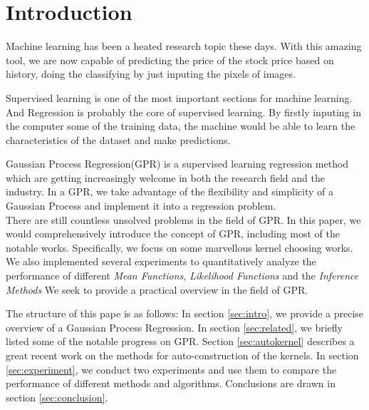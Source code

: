 \section{Introduction} \label{sec:introduction}

Machine learning has been a heated research topic these days. With this amazing tool, we are now capable of predicting the price of the stock price based on history, doing the classifying by just inputing the pixels of images.

Supervised learning is one of the most important sections for machine learning. And Regression is probably the core of supervised learning. By firstly inputing in the computer some of the training data, the machine would be able to learn the characteristics of the dataset and make predictions.

Gaussian Process Regression(GPR) is a supervised learning regression method which are getting increasingly welcome in both the research field and the industry. 
In a GPR, we take advantage of the flexibility and simplicity of a Gaussian Process and implement it into a regression problem. \\

There are still countless unsolved problems in the field of GPR.
In this paper, we would comprehensively introduce the concept of GPR, including most of the notable works.
Specifically, we focus on some marvellous kernel choosing works.
We also implemented several experiments to quantitatively analyze the performance of different \emph{Mean Functions}, \emph{Likelihood Functions} and the \emph{Inference Methods}
We seek to provide a practical overview in the field of GPR.

The structure of this pape is as follows: 
In section \ref{sec:intro}, we provide a precise overview of a Gaussian Process Regression. 
In section \ref{sec:related}, we briefly listed some of the notable progress on GPR.
Section \ref{sec:autokernel} describes a great recent work on the methods for auto-construction of the kernels.
In section \ref{sec:experiment}, we conduct two experiments and use them to compare the performance of different methods and algorithms.
Conclusions are drawn in section \ref{sec:conclusion}.

